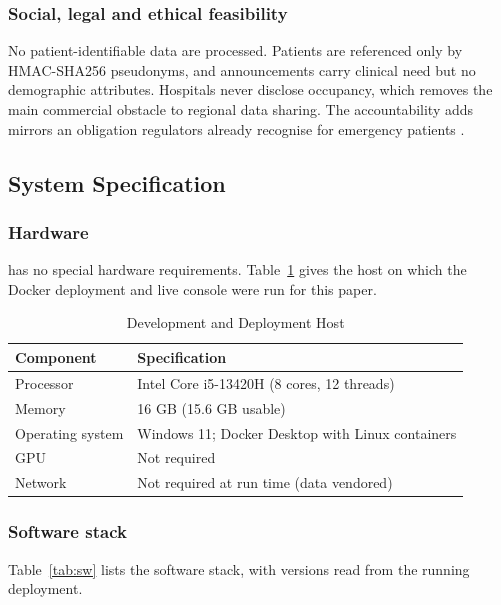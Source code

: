 \subsubsection{Social, legal and ethical feasibility}
No patient-identifiable data are processed. Patients are referenced only by HMAC-SHA256 pseudonyms, and announcements carry clinical need but no demographic attributes. Hospitals never disclose occupancy, which removes the main commercial obstacle to regional data sharing. The accountability \mahros{} adds mirrors an obligation regulators already recognise for emergency patients \cite{emtala489}.

\subsection{System Specification}
\subsubsection{Hardware}
\mahros{} has no special hardware requirements. Table~\ref{tab:hw} gives the host on which the Docker deployment and live console were run for this paper.

\begin{table}[!t]
\centering
\caption{Development and Deployment Host}
\label{tab:hw}
\scriptsize
\setlength{\tabcolsep}{3pt}
\begin{tabular}{@{}p{2.0cm}p{5.6cm}@{}}
\toprule
Component & Specification \\
\midrule
Processor & Intel Core i5-13420H (8 cores, 12 threads) \\
Memory & 16 GB (15.6 GB usable) \\
Operating system & Windows 11; Docker Desktop with Linux containers \\
GPU & Not required \\
Network & Not required at run time (data vendored) \\
\bottomrule
\end{tabular}
\end{table}

\subsubsection{Software stack}
Table~\ref{tab:sw} lists the software stack, with versions read from the running deployment.

